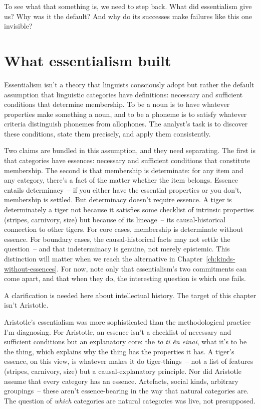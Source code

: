 To see what that something is, we need to step back. What did essentialism give us? Why was it the default? And why do its successes make failures like this one invisible?

\section{What essentialism built}
\label{sec:2:what-essentialism-built}

Essentialism isn't a theory that linguists consciously adopt but rather the default assumption that linguistic categories have definitions: necessary and sufficient conditions that determine membership. To be a noun is to have whatever properties make something a noun, and to be a phoneme is to satisfy whatever criteria distinguish phonemes from allophones. The analyst's task is to discover these conditions, state them precisely, and apply them consistently.

Two claims are bundled in this assumption, and they need separating. The first is that categories have essences: necessary and sufficient conditions that constitute membership. The second is that membership is determinate: for any item and any category, there's a fact of the matter whether the item belongs. Essence entails determinacy~-- if you either have the essential properties or you don't, membership is settled. But determinacy doesn't require essence. A tiger is determinately a tiger not because it satisfies some checklist of intrinsic properties (stripes, carnivory, size) but because of its lineage~-- its causal-historical connection to other tigers. For core cases, membership is determinate without essence. For boundary cases, the causal-historical facts may not settle the question~-- and that indeterminacy is genuine, not merely epistemic. This distinction will matter when we reach the alternative in Chapter~\ref{ch:kinds-without-essences}. For now, note only that essentialism's two commitments can come apart, and that when they do, the interesting question is which one fails.

A clarification is needed here about intellectual history. The target of this chapter isn't Aristotle.

Aristotle's essentialism was more sophisticated than the methodological practice I'm diagnosing. For Aristotle, an essence isn't a checklist of necessary and sufficient conditions but an explanatory core: the \emph{to ti \^en einai}, what it's to be the thing, which explains why the thing has the properties it has. A tiger's essence, on this view, is whatever makes it do tiger-things~-- not a list of features (stripes, carnivory, size) but a causal-explanatory principle. Nor did Aristotle assume that every category has an essence. Artefacts, social kinds, arbitrary groupings~-- these aren't essence-bearing in the way that natural categories are. The question of \emph{which} categories are natural categories was live, not presupposed.


